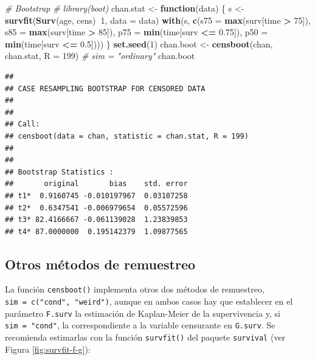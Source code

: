 \documentclass[]{book}
\newenvironment{Shaded}{\begin{snugshade}}{\end{snugshade}}
\newcommand{\KeywordTok}[1]{\textcolor[rgb]{0.13,0.29,0.53}{\textbf{#1}}}
\newcommand{\DataTypeTok}[1]{\textcolor[rgb]{0.13,0.29,0.53}{#1}}
\newcommand{\DecValTok}[1]{\textcolor[rgb]{0.00,0.00,0.81}{#1}}
\newcommand{\FloatTok}[1]{\textcolor[rgb]{0.00,0.00,0.81}{#1}}
\newcommand{\StringTok}[1]{\textcolor[rgb]{0.31,0.60,0.02}{#1}}
\newcommand{\CommentTok}[1]{\textcolor[rgb]{0.56,0.35,0.01}{\textit{#1}}}
\newcommand{\ControlFlowTok}[1]{\textcolor[rgb]{0.13,0.29,0.53}{\textbf{#1}}}
\newcommand{\OperatorTok}[1]{\textcolor[rgb]{0.81,0.36,0.00}{\textbf{#1}}}
\newcommand{\NormalTok}[1]{#1}
\theoremstyle{definition}
\theoremstyle{definition}
\theoremstyle{definition}
\theoremstyle{remark}
\begin{document}
\begin{Shaded}
\begin{Highlighting}[]
\CommentTok{# Bootstrap}
\CommentTok{# library(boot)}
\NormalTok{chan.stat <-}\StringTok{ }\ControlFlowTok{function}\NormalTok{(data) \{}
\NormalTok{    s <-}\StringTok{ }\KeywordTok{survfit}\NormalTok{(}\KeywordTok{Surv}\NormalTok{(age, cens)}\OperatorTok{~}\DecValTok{1}\NormalTok{, }\DataTypeTok{data =}\NormalTok{ data)}
    \KeywordTok{with}\NormalTok{(s, }\KeywordTok{c}\NormalTok{(}\DataTypeTok{s75 =} \KeywordTok{max}\NormalTok{(surv[time }\OperatorTok{>}\StringTok{ }\DecValTok{75}\NormalTok{]), }\DataTypeTok{s85 =} \KeywordTok{max}\NormalTok{(surv[time }\OperatorTok{>}\StringTok{ }\DecValTok{85}\NormalTok{]),}
            \DataTypeTok{p75 =} \KeywordTok{min}\NormalTok{(time[surv }\OperatorTok{<=}\StringTok{ }\FloatTok{0.75}\NormalTok{]), }\DataTypeTok{p50 =} \KeywordTok{min}\NormalTok{(time[surv }\OperatorTok{<=}\StringTok{ }\FloatTok{0.5}\NormalTok{])))}
\NormalTok{\}}
\KeywordTok{set.seed}\NormalTok{(}\DecValTok{1}\NormalTok{)}
\NormalTok{chan.boot <-}\StringTok{ }\KeywordTok{censboot}\NormalTok{(chan, chan.stat, }\DataTypeTok{R =} \DecValTok{199}\NormalTok{) }\CommentTok{# sim = "ordinary"}
\NormalTok{chan.boot}
\end{Highlighting}
\end{Shaded}

\begin{verbatim}
## 
## CASE RESAMPLING BOOTSTRAP FOR CENSORED DATA
## 
## 
## Call:
## censboot(data = chan, statistic = chan.stat, R = 199)
## 
## 
## Bootstrap Statistics :
##       original       bias    std. error
## t1*  0.9160745 -0.010197967  0.03107258
## t2*  0.6347541 -0.006979654  0.05572596
## t3* 82.4166667 -0.061139028  1.23839853
## t4* 87.0000000  0.195142379  1.09877565
\end{verbatim}

\subsection{Otros métodos de
remuestreo}\label{otros-metodos-de-remuestreo}

La función \texttt{censboot()} implementa otros dos métodos de
remuestreo, \texttt{sim\ =\ c("cond",\ "weird")}, aunque en ambos casos
hay que establecer en el parámetro \texttt{F.surv} la estimación de
Kaplan-Meier de la supervivencia y, si \texttt{sim\ =\ "cond"}, la
correspondiente a la variable censurante en \texttt{G.surv}. Se
recomienda estimarlas con la función \texttt{survfit()} del paquete
\texttt{survival} (ver Figura \ref{fig:survfit-f-g}):
\end{document}
